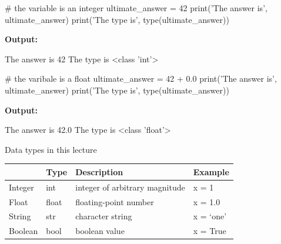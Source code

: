 \documentclass[
  american,
  ignorenonframetext,
]{beamer}
\newenvironment{pyexec}[1]{\noindent \textbf{Output: }  #1}{}
\begin{document}
\begin{frame}{}
\protect\hypertarget{section-2}{}

\begin{pythoncode}

# the variable is an integer
ultimate_answer = 42
print('The answer is', ultimate_answer)
print('The type is', type(ultimate_answer))

\end{pythoncode}

\begin{pyexec}

\begin{outputcode}

The answer is 42
The type is <class 'int'>

\end{outputcode}

\end{pyexec}

\end{frame}

\begin{frame}{}
\protect\hypertarget{section-3}{}

\begin{pythoncode}

# the varibale is a float
ultimate_answer = 42 + 0.0
print('The answer is', ultimate_answer)
print('The type is', type(ultimate_answer))

\end{pythoncode}

\begin{pyexec}

\begin{outputcode}

The answer is 42.0
The type is <class 'float'>

\end{outputcode}

\end{pyexec}


\end{frame}

\begin{frame}{Data types in this lecture}
\protect\hypertarget{data-types-in-this-lecture}{}

\begin{longtable}[]{@{}llll@{}}
\toprule
& Type & Description & Example\tabularnewline
\midrule
\endhead
Integer & int & integer of arbitrary magnitude & x = 1\tabularnewline
Float & float & floating-point number & x = 1.0\tabularnewline
String & str & character string & x = `one'\tabularnewline
Boolean & bool & boolean value & x = True\tabularnewline
\bottomrule
\end{longtable}


\end{frame}
\end{document}

